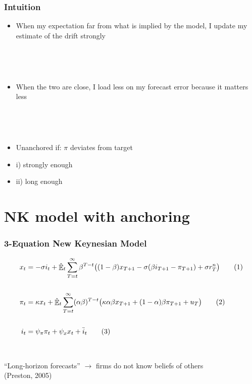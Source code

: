 \documentclass{beamer}
\DeclareMathOperator{\E}{\mathbb{E}}
\newcommand\numberthis{\addtocounter{equation}{1}\tag{\theequation}} %
\begin{document}
\begin{frame}
	\frametitle{Intuition}

\begin{itemize}
\item When my expectation far from what is implied by the model, I update my estimate of the drift strongly 

\

\

\item When the two are close, I load less on my forecast error because it matters less

\

\

\item Unanchored if: $\pi$ deviates from target 
\item[] i) strongly enough
\item [] ii) long enough
\end{itemize}



\end{frame}


\section{NK model with anchoring}

\begin{frame}
	\frametitle{3-Equation New Keynesian Model}

\begin{align*}
x_t &=  -\sigma i_t +\hat{\E}_t \sum_{T=t}^{\infty} \beta^{T-t }\big( (1-\beta)x_{T+1} - \sigma(\beta i_{T+1} - \pi_{T+1}) +\sigma r_T^n \big) \label{prestons18}  \numberthis \\
\\
\pi_t &= \kappa x_t +\hat{\E}_t \sum_{T=t}^{\infty} (\alpha\beta)^{T-t }\big( \kappa \alpha \beta x_{T+1} + (1-\alpha)\beta \pi_{T+1} + u_T\big) \label{prestons19}  \numberthis \\
\\
i_t &= \psi_{\pi}\pi_t + \psi_{x} x_t + \bar{i}_t \label{TR} \numberthis
\end{align*}

\

``Long-horizon forecasts'' $\rightarrow$ firms do not know beliefs of others \\
(Preston, 2005)

\end{frame}
\end{document}
